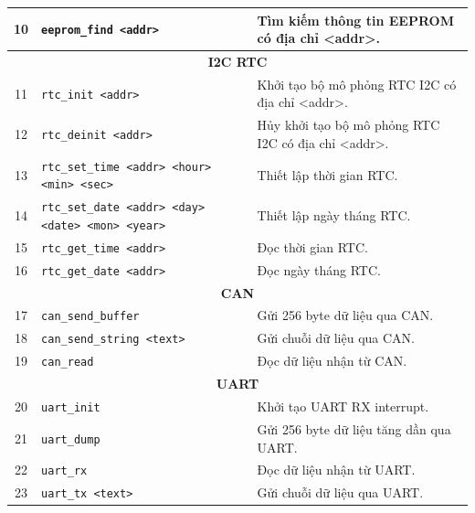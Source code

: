 \begin{longtable}{|c|p{4.8cm}|p{7.2cm}|}
10
& \texttt{eeprom\_find <addr>}
& Tìm kiếm thông tin EEPROM có địa chỉ <addr>. \\
\hline

\multicolumn{3}{|c|}{\textbf{I2C RTC}} \\
\hline

11
& \texttt{rtc\_init <addr>}
& Khởi tạo bộ mô phỏng RTC I2C có địa chỉ <addr>. \\
\hline

12
& \texttt{rtc\_deinit <addr>}
& Hủy khởi tạo bộ mô phỏng RTC I2C có địa chỉ <addr>. \\
\hline

13
& \texttt{rtc\_set\_time <addr> <hour> <min> <sec>}
& Thiết lập thời gian RTC. \\
\hline

14
& \texttt{rtc\_set\_date <addr> <day> <date> <mon> <year>}
& Thiết lập ngày tháng RTC. \\
\hline

15
& \texttt{rtc\_get\_time <addr>}
& Đọc thời gian RTC. \\
\hline

16
& \texttt{rtc\_get\_date <addr>}
& Đọc ngày tháng RTC. \\
\hline

\multicolumn{3}{|c|}{\textbf{CAN}} \\
\hline

17
& \texttt{can\_send\_buffer}
& Gửi 256 byte dữ liệu qua CAN. \\
\hline

18
& \texttt{can\_send\_string <text>}
& Gửi chuỗi dữ liệu qua CAN. \\
\hline

19
& \texttt{can\_read}
& Đọc dữ liệu nhận từ CAN. \\
\hline

\multicolumn{3}{|c|}{\textbf{UART}} \\
\hline

20
& \texttt{uart\_init}
& Khởi tạo UART RX interrupt. \\
\hline

21
& \texttt{uart\_dump}
& Gửi 256 byte dữ liệu tăng dần qua UART. \\
\hline

22
& \texttt{uart\_rx}
& Đọc dữ liệu nhận từ UART. \\
\hline

23
& \texttt{uart\_tx <text>}
& Gửi chuỗi dữ liệu qua UART. \\
\hline


\end{longtable}
